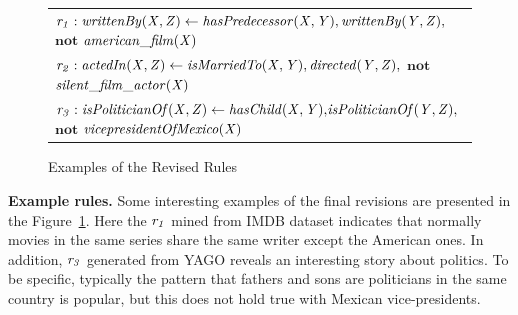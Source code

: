 \begin{figure}[t]
    \centering
   
    \vspace{-.2cm}
    \begin{tabular}{l}
 {\scriptsize
        $\mathit{r_1: writtenBy(X, Z)}  \leftarrow
        \mathit{hasPredecessor(X, Y)},\mathit{writtenBy(Y, Z)},$ $ \textbf{not}$  $\mathit{american\_film(X)} $}\\        
       {\scriptsize 
$\mathit{r_2:  actedIn(X, Z)}  \leftarrow
        \mathit{isMarriedTo(X, Y)},\mathit{directed(Y, Z)},$ $ \textbf{not}$  $\mathit{silent\_film\_actor(X)} $} \\
          {\scriptsize 
$\mathit{r_3:  isPoliticianOf(X, Z)}  \leftarrow
        \mathit{hasChild(X, Y)}{,}\mathit{isPoliticianOf(Y, Z)}{,}$$ \textbf{not}$  $\mathit{vicepresidentOfMexico(X)} $} \\
 \end{tabular}            
    \caption{Examples of the Revised Rules}
 \label{fig:examplerules}
 \vspace{-.4cm}
\end{figure}

\textbf{Example rules.} Some interesting examples of the final revisions are presented in the Figure~\ref{fig:examplerules}. Here 
the $\mathit{r_1}$ mined from IMDB dataset indicates that normally movies in the same series share the same writer except the American ones. In addition, $\mathit{r_3}$ generated from YAGO reveals an interesting story about politics. To be specific, typically  the pattern that fathers and sons are politicians in the same country is popular, but this does not hold true with Mexican vice-presidents.
